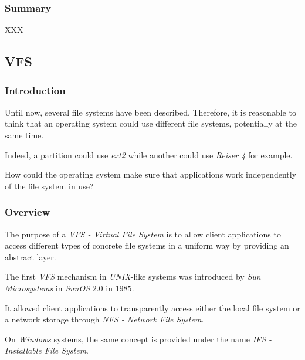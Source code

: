 
\begin{frame}
  \frametitle{Summary}

  XXX
\end{frame}


\subsection{VFS}


\begin{frame}
  \frametitle{Introduction}

  Until now, several file systems have been described. Therefore, it is
  reasonable to think that an operating system could use different
  file systems, potentially at the same time.

  \-

  Indeed, a partition could use \textit{ext2} while another could use
  \textit{Reiser 4} for example.

  \-

  How could the operating system make sure that applications work
  independently of the file system in use?
\end{frame}


\begin{frame}
  \frametitle{Overview}

  The purpose of a \textit{VFS - Virtual File System} is to allow client
  applications to access different types of concrete file systems in a uniform
  way by providing an abstract layer.

  \-

  The first \textit{VFS} mechanism in \textit{UNIX}-like systems was introduced
  by \textit{Sun Microsystems} in \textit{SunOS} $2.0$ in $1985$.

  \-

  It allowed client applications to transparently access either the local
  file system or a network storage through \textit{NFS - Network File System}.

  \-

  On \textit{Windows} systems, the same concept is provided under the
  name \textit{IFS - Installable File System}.
\end{frame}


